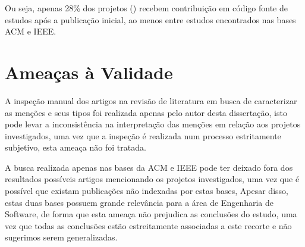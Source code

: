 Ou seja, apenas 28\% dos projetos ()
recebem contribuição em código fonte de estudos após a publicação inicial, ao
menos entre estudos encontrados nas bases ACM e IEEE.




%



\section{Ameaças à Validade}  \label{estudo2:ameacas} %

A inspeção manual dos artigos na revisão de literatura em busca de caracterizar
as menções e seus tipos foi realizada apenas pelo autor desta dissertação, isto
pode levar a inconsistência na interpretação das menções em relação aos projetos
investigados, uma vez que a inspeção é realizada num processo estritamente
subjetivo, esta ameaça não foi tratada.

A busca realizada apenas nas bases da ACM e IEEE pode ter deixado fora dos
resultados possíveis artigos mencionando os projetos investigados, uma vez que
é possível que existam publicações não indexadas por estas bases, Apesar disso,
estas duas bases possuem grande relevância para a área de Engenharia de
Software, de forma que esta ameaça não prejudica as conclusões do estudo, uma
vez que todas as conclusões estão estreitamente associadas a este recorte e não
sugerimos serem generalizadas.

